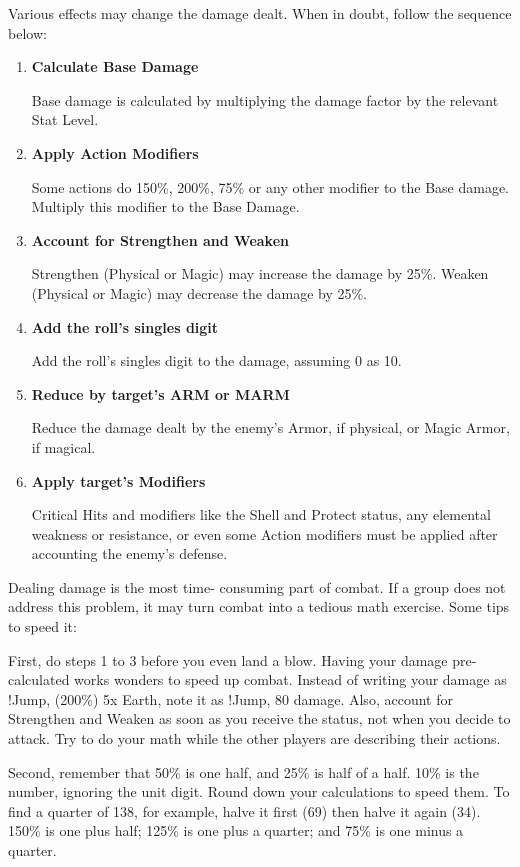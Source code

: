 Various effects may change the damage
dealt. When in doubt, follow the sequence below:
\begin{enumerate}
\item \textbf{Calculate Base Damage}

Base damage is calculated by multiplying the
damage factor by the relevant Stat Level.

\item \textbf{Apply Action Modifiers}

Some actions do 150\%, 200\%, 75\% or any
other modifier to the Base damage. Multiply this
modifier to the Base Damage.

\item \textbf{Account for Strengthen and Weaken}

Strengthen (Physical or Magic) may increase
the damage by 25\%. Weaken (Physical or Magic)
may decrease the damage by 25\%.

\item \textbf{Add the roll's singles digit}

Add the roll's singles digit to the damage,
assuming 0 as 10.

\item \textbf{Reduce by target's ARM or MARM}

Reduce the damage dealt by the enemy's
Armor, if physical, or Magic Armor, if magical.

\item \textbf{Apply target's Modifiers}

Critical Hits and modifiers like the Shell and
Protect status, any elemental weakness or
resistance, or even some Action modifiers must be
applied after accounting the enemy's defense.
\end{enumerate}

Dealing damage is the most time-
consuming part of combat. If a group does not
address this problem, it may turn combat into a
tedious math exercise. Some tips to speed it:

First, do steps 1 to 3 before you even land
a blow. Having your damage pre-calculated
works wonders to speed up combat. Instead of
writing your damage as !Jump, (200\%) 5x Earth,
note it as !Jump, 80 damage. Also, account for
Strengthen and Weaken as soon as you receive
the status, not when you decide to attack. Try to
do your math while the other players are
describing their actions.

Second, remember that 50\% is one half,
and 25\% is half of a half. 10\% is the number,
ignoring the unit digit. Round down your
calculations to speed them. To find a quarter of
138, for example, halve it first (69) then halve it
again (34). 150\% is one plus half; 125\% is one
plus a quarter; and 75\% is one minus a quarter.

